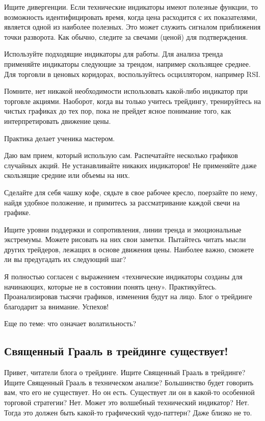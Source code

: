 \documentclass{book}
\begin{document}
Ищите дивергенции. Если технические индикаторы имеют полезные функции, то возможность идентифицировать время, когда цена расходится с их показателями, является одной из наиболее полезных. Это может служить сигналом приближения точки разворота. Как обычно, следите за свечами (ценой) для подтверждения.

Используйте подходящие индикаторы для работы. Для анализа тренда применяйте индикаторы следующие за трендом, например скользящее среднее. Для торговли в ценовых коридорах, воспользуйтесь осциллятором, например RSI.

Помните, нет никакой необходимости использовать какой-либо индикатор при торговле акциями. Наоборот, когда вы только учитесь трейдингу, тренируйтесь на чистых графиках до тех пор, пока не прейдет ясное понимание того, как интерпретировать движение цены.

Практика делает ученика мастером.

Даю вам прием, который использую сам. Распечатайте несколько графиков случайных акций. Не устанавливайте никаких индикаторов! Не применяйте даже скользящие средние или объемы на них.

Сделайте для себя чашку кофе, сядьте в свое рабочее кресло, поерзайте по нему, найдя удобное положение, и примитесь за рассматривание каждой свечи на графике.

Ищите уровни поддержки и сопротивления, линии тренда и эмоциональные экстремумы. Можете рисовать на них свои заметки. Пытайтесь читать мысли других трейдеров, лежащих в основе движения цены. Наиболее важно, сможете ли вы предугадать их следующий шаг?

Я полностью согласен с выражением «технические индикаторы созданы для начинающих, которые не в состоянии понять цену». Практикуйтесь. Проанализировав тысячи графиков, изменения будут на лицо. Блог о трейдинге благодарит за внимание. Успехов!

Еще по теме: что означает волатильность?

\subsection{Священный Грааль в трейдинге существует!}

Привет, читатели блога о трейдинге. Ищите Священный Грааль в трейдинге? Ищите Священный Грааль в техническом анализе? Большинство будет говорить вам, что его не существует. Но он есть. Существует ли он в какой-то особенной торговой стратегии? Нет. Может это волшебный технический индикатор? Нет. Тогда это должен быть какой-то графический чудо-паттерн? Даже близко не то.
\end{document}
